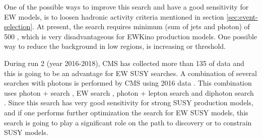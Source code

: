 One of the possible ways to improve this search and have a good sensitivity for EW models, is to loosen hadronic activity criteria 
mentioned in section \ref{sec:event-selection}. At present, the search requires minimum \ST (sum \pt of jets and photon) of 500 \gev,
which is very disadvantageous for EWKino production models. One possible way to reduce the background in low \ST regions, is increasing
\ptg or \ptmiss threshold.

During run 2 (year 2016-2018), CMS has collected more than 135 \fbinv of data and this is going to be an advantage for EW SUSY
searches. A combination of several searches with photons is performed by CMS using 2016 data \cite{CMS-PAS-SUS-18-005}.
This combination uses photon + \ST search \cite{Sirunyan:2017yse}, EW search \cite{Sirunyan:2017nyt}, photon + lepton search
\cite{Sirunyan:2018psa} and diphoton search \cite{Sirunyan:2019mbp}. Since this search has very good sensitivity 
for strong SUSY production models, and if one performs further optimization the search for EW SUSY models, this search is going to play
a significant role on the path to discovery or to constrain SUSY models.